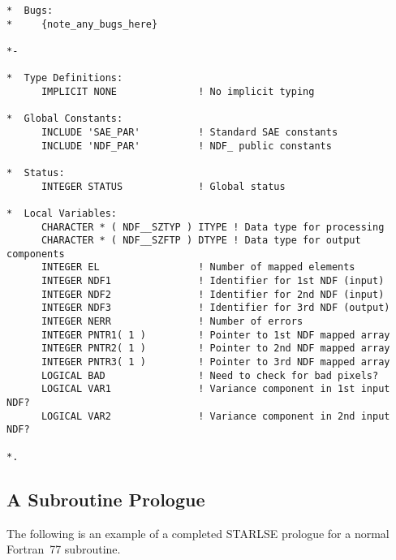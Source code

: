 \begin{verbatim}
*  Bugs:
*     {note_any_bugs_here}

*-
      
*  Type Definitions:
      IMPLICIT NONE              ! No implicit typing

*  Global Constants:
      INCLUDE 'SAE_PAR'          ! Standard SAE constants
      INCLUDE 'NDF_PAR'          ! NDF_ public constants

*  Status:
      INTEGER STATUS             ! Global status

*  Local Variables:
      CHARACTER * ( NDF__SZTYP ) ITYPE ! Data type for processing
      CHARACTER * ( NDF__SZFTP ) DTYPE ! Data type for output components
      INTEGER EL                 ! Number of mapped elements
      INTEGER NDF1               ! Identifier for 1st NDF (input)
      INTEGER NDF2               ! Identifier for 2nd NDF (input)
      INTEGER NDF3               ! Identifier for 3rd NDF (output)
      INTEGER NERR               ! Number of errors
      INTEGER PNTR1( 1 )         ! Pointer to 1st NDF mapped array
      INTEGER PNTR2( 1 )         ! Pointer to 2nd NDF mapped array
      INTEGER PNTR3( 1 )         ! Pointer to 3rd NDF mapped array
      LOGICAL BAD                ! Need to check for bad pixels?
      LOGICAL VAR1               ! Variance component in 1st input NDF?
      LOGICAL VAR2               ! Variance component in 2nd input NDF?

*.
\end{verbatim}
\normalsize

\subsection{A Subroutine Prologue}

The following is an example of a completed STARLSE prologue for a normal
Fortran~77 subroutine. 

